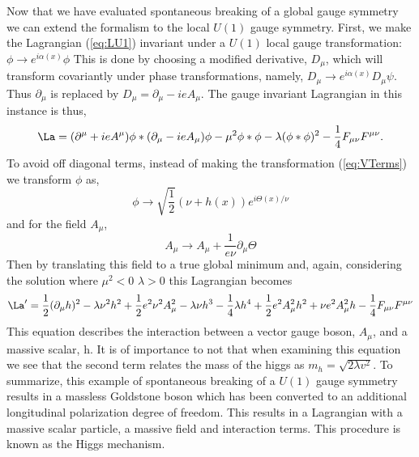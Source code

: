 Now that we have evaluated spontaneous breaking of 
a global gauge symmetry we can extend the formalism to the local $U(1)$ gauge symmetry.
First, we make the Lagrangian (\ref{eq:LU1}) invariant under a $U(1)$ 
local gauge transformation: $\phi\rightarrow e^{i\alpha(x)}\phi$
This is done by choosing a modified derivative, $D_{\mu}$, which will
transform covariantly under phase transformations, namely, 
$D_{\mu}\rightarrow e^{i\alpha(x)}D_{\mu}\psi$. Thus $\partial_{\mu}$
is replaced by $D_{\mu} = \partial_{\mu}-ieA_{\mu}$.
The gauge invariant Lagrangian in this instance is thus,
\begin{equation}
\La=(\partial^{\mu}+ieA^{\mu})\phi*(\partial_{\mu}-ieA_{\mu})\phi - \mu^{2} \phi*\phi - \lambda(\phi*\phi)^{2}-\frac{1}{4}F_{\mu\nu}F^{\mu\nu}.
\end{equation}
To avoid off diagonal terms, instead of making the transformation (\ref{eq:VTerms})
we transform $\phi$ as,
\begin{equation}
\phi\rightarrow\sqrt{\frac{1}{2}}(\nu+h(x))e^{i\Theta(x)/\nu}
\end{equation}
and for the field $A_{\mu}$,
\begin{equation}
A_{\mu}\rightarrow A_{\mu}+\frac{1}{e\nu}\partial_{\mu}\Theta
\end{equation}
Then by translating this field to a true global minimum
and, again, considering the solution where $\mu^{2}<0$ $\lambda>0$ this Lagrangian becomes 
\begin{equation}
\La'=\frac{1}{2}(\partial_{\mu}h)^{2}-\lambda \nu^{2}h^{2}+\frac{1}{2}e^{2}\nu^{2}A_{\mu}^{2}-\lambda\nu h^{3}-
\frac{1}{4}\lambda h^{4} + \frac{1}{2}e^{2}A_{\mu}^{2}h^{2}+\nu e^{2}A_{\mu}^{2}h-\frac{1}{4}F_{\mu\nu}F^{\mu\nu}
\end{equation}
This equation describes the interaction between a vector gauge boson,
$A_{\mu}$, and a massive scalar, h. 
It is of importance to not that when examining this equation 
we see that the second term relates the mass 
of the higgs as $m_{h}=\sqrt{2\lambda v^{2}}$. 
To summarize, this example of spontaneous breaking of a $U(1)$ gauge symmetry
results in a massless Goldstone boson which has been converted to an
additional longitudinal polarization degree of freedom. This results
in a Lagrangian with a massive scalar particle, a massive field and interaction terms.
This procedure is known as the Higgs mechanism. 

